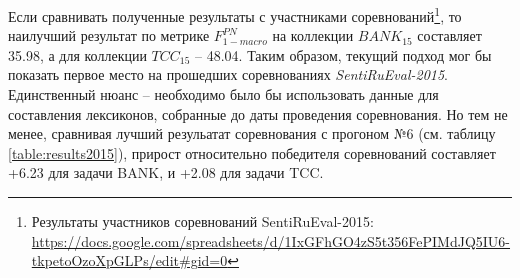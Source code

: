 Если сравнивать полученные результаты с участниками соревнований\footnote{
    Результаты участников соревнований SentiRuEval-2015:
    \url{https://docs.google.com/spreadsheets/d/1IxGFhGO4zS5t356FePIMdJQ5IU6-tkpetoOzoXpGLPs/edit\#gid=0}
},
то наилучший результат по метрике $F_{1-macro}^{PN}$ на коллекции $BANK_{15}$
составляет 35.98, а для коллекции $TCC_{15}$ -- 48.04.
Таким образом, текущий подход мог бы показать первое место на прошедших
соревнованиях {\it SentiRuEval-2015}.
Единственный нюанс -- необходимо было бы использовать данные для составления
лексиконов, собранные до даты проведения соревнования.
Но тем не менее, сравнивая лучший резульатат соревнования с прогоном №6
(см. таблицу \ref{table:results2015}), прирост относительно победителя
соревнований составляет +6.23 для задачи BANK, и +2.08 для задачи TCC.
